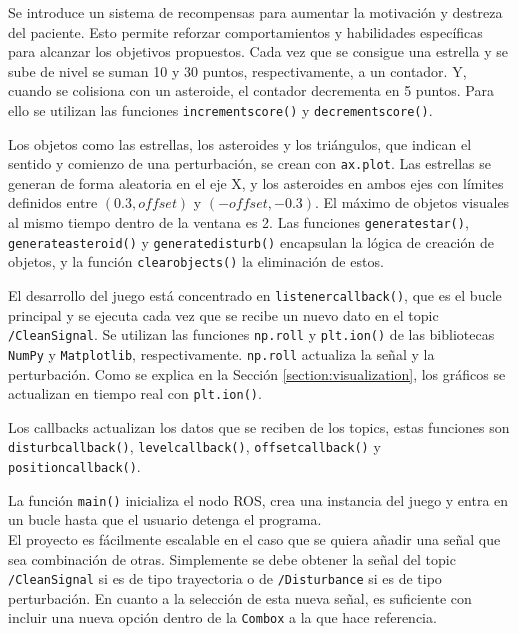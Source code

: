 Se introduce un sistema de recompensas para aumentar la motivación y destreza del paciente.
Esto permite reforzar comportamientos y habilidades específicas para alcanzar los objetivos propuestos.
Cada vez que se consigue una estrella y se sube de nivel se suman 10 y 30 puntos, respectivamente, a un contador.
Y, cuando se colisiona con un asteroide, el contador decrementa en 5 puntos.
Para ello se utilizan las funciones \verb|incrementscore()| y \verb|decrementscore()|.

Los objetos como las estrellas, los asteroides y los triángulos, que indican el sentido y comienzo de una perturbación, se crean con \verb|ax.plot|.
Las estrellas se generan de forma aleatoria en el eje X, y los asteroides en ambos ejes con límites definidos entre $(0.3, offset)$ y $(-offset, -0.3)$.
El máximo de objetos visuales al mismo tiempo dentro de la ventana es 2.
Las funciones \verb|generatestar()|, \verb|generateasteroid()| y \verb|generatedisturb()| encapsulan la lógica de creación de objetos, y la función \verb|clearobjects()| la eliminación de estos.

El desarrollo del juego está concentrado en \verb|listenercallback()|, que es el bucle principal y se ejecuta cada vez que se recibe un nuevo dato en el topic \verb|/CleanSignal|.
Se utilizan las funciones \verb|np.roll| y \verb|plt.ion()| de las bibliotecas \verb|NumPy| y \verb|Matplotlib|, respectivamente.
\verb|np.roll| actualiza la señal y la perturbación.
Como se explica en la Sección \ref{section:visualization}, los gráficos se actualizan en tiempo real con \verb|plt.ion()|.

Los callbacks actualizan los datos que se reciben de los topics, estas funciones son \verb|disturbcallback()|, \verb|levelcallback()|, \verb|offsetcallback()| y \verb|positioncallback()|.

La función \verb|main()| inicializa el nodo ROS, crea una instancia del juego y entra en un bucle hasta que el usuario detenga el programa.\\

El proyecto es fácilmente escalable en el caso que se quiera añadir una señal que sea combinación de otras.
Simplemente se debe obtener la señal del topic \verb|/CleanSignal| si es de tipo trayectoria o de \verb|/Disturbance| si es de tipo perturbación.
En cuanto a la selección de esta nueva señal, es suficiente con incluir una nueva opción dentro de la \verb|Combox| a la que hace referencia.
